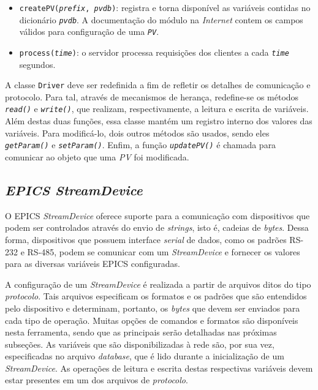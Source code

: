 \begin{itemize}
  \renewcommand\labelitemi{--}
  \item \texttt{createPV(\textit{prefix}, \textit{pvdb})}: registra e torna
  disponível as variáveis contidas no dicionário \texttt{\textit{pvdb}}. A
  documentação do módulo na \textit{Internet} contem os campos válidos para
  configuração de uma \texttt{\textit{PV}}.

  \item \texttt{process(\textit{time})}: o servidor processa requisições dos
  clientes a cada \texttt{\textit{time}} segundos.
\end{itemize}

A classe \texttt{Driver} deve ser redefinida a fim de refletir os detalhes de
comunicação e protocolo.  Para tal, através de mecanismos de herança,
redefine-se os métodos \texttt{\textit{read()}} e \texttt{\textit{write()}}, que
realizam, respectivamente, a leitura e escrita de variáveis. Além destas duas
funções, essa classe mantém um registro interno dos valores das variáveis. Para
modificá-lo, dois outros métodos são usados, sendo eles
\texttt{\textit{getParam()}} e \texttt{\textit{setParam()}}. Enfim, a função
\texttt{\textit{updatePV()}} é chamada para comunicar ao objeto
 que uma \textit{PV} foi modificada.

\subsection{\textit{EPICS StreamDevice}}

O EPICS \textit{StreamDevice} oferece suporte para a comunicação com
dispositivos que podem ser controlados através do envio de \textit{strings},
isto é, cadeias de \textit{bytes}. Dessa forma, dispositivos que possuem
interface \textit{serial} de dados, como os padrões RS-232 e RS-485, podem se
comunicar com um \textit{StreamDevice} e fornecer os valores para as diversas
variáveis EPICS configuradas.

\vspace{12pt}

A configuração de um \textit{StreamDevice} é realizada a partir de arquivos
ditos do tipo \textit{protocolo}. Tais arquivos especificam os formatos e os
padrões que são entendidos pelo dispositivo e determinam, portanto, os
\textit{bytes} que devem ser enviados para cada tipo de operação. Muitas opções
de comandos e formatos são disponíveis nesta ferramenta, sendo que as principais
serão detalhadas nas próximas subseções. As variáveis que são disponibilizadas à
rede são, por sua vez, especificadas no arquivo \textit{database}, que é lido
durante a inicialização de um \textit{StreamDevice}. As operações de leitura e
escrita destas respectivas variáveis devem estar presentes em um dos arquivos de
\textit{protocolo}.

